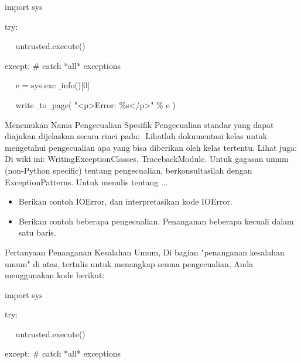 {\fontsize{10pt}{10pt}\selectfont  import sys}
 

{\fontsize{10pt}{10pt}\selectfont  try:} 


{\fontsize{10pt}{10pt}\selectfont ~~ untrusted.execute()} 


{\fontsize{10pt}{10pt}\selectfont  except:  $  \#  $ catch *all* exceptions} 


{\fontsize{10pt}{10pt}\selectfont ~~ e = sys.exc $  \_  $info()[0]} 


{\fontsize{10pt}{10pt}\selectfont ~~ write $  \_  $to $  \_  $page( "<p>Error:  $  \%  $s</p>"  $  \%  $ e )} 
\vspace{10pt}

 \hspace*{0.64in} Menemukan Nama Pengecualian Spesifik Pengecualian standar yang dapat diajukan dijelaskan secara rinci pada: $  $
 Lihatlah dokumentasi kelas untuk mengetahui pengecualian apa yang bisa diberikan oleh kelas tertentu. Lihat juga: Di wiki ini: WritingExceptionClasses, TracebackModule. Untuk gagasan umum (non-Python specific) tentang pengecualian, berkonsultasilah dengan ExceptionPatterns. Untuk menulis tentang ... 

\vspace{12pt}
 
\begin{itemize}
\item Berikan contoh IOError, dan interpretasikan kode IOError. 

\item Berikan contoh beberapa pengecualian. Penanganan beberapa kecuali dalam satu baris.\end{itemize}
 
 
\vspace{12pt}

Pertanyaan Penanganan Kesalahan Umum, Di bagian "penanganan kesalahan umum" di atas, tertulis untuk menangkap semua pengecualian, Anda menggunakan kode berikut: 
\vspace{14pt}
 
{\fontsize{10pt}{10pt}\selectfont import sys} 


{\fontsize{10pt}{10pt}\selectfont  try:} 

\vspace{10pt}
 

{\fontsize{10pt}{10pt}\selectfont ~~ untrusted.execute()} 

\vspace{10pt}


{\fontsize{10pt}{10pt}\selectfont  except:  $  \#  $ catch *all* exceptions} 

